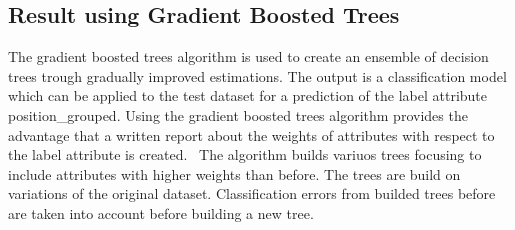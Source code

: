 \subsection{Result using Gradient Boosted Trees}

The gradient boosted trees algorithm is used to create an ensemble of decision trees trough gradually improved estimations. The output is a classification model which can be applied to the test dataset for a prediction of the label attribute position\_grouped. Using the gradient boosted trees algorithm provides the advantage that a written report about the weights of attributes with respect to the label attribute is created.~\cite{ref_rapidminergbt}
The algorithm builds variuos trees focusing to include attributes with higher weights than before. The trees are build on variations of the original dataset. Classification errors from builded trees before are taken into account before building a new tree. ~\cite{ref_towardsGBT}

